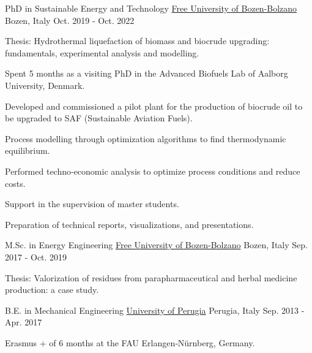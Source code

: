 
\begin{cventries}

\cventry
{PhD in Sustainable Energy and Technology}
{\href{https://unibz.it}{Free University of Bozen-Bolzano}}
{Bozen, Italy}
{Oct. 2019 - Oct. 2022}
{\begin{cvitems}
\item {Thesis: Hydrothermal liquefaction of biomass and biocrude upgrading: fundamentals, experimental analysis and modelling.}
\item {Spent 5 months as a visiting PhD in the Advanced Biofuels Lab of Aalborg University, Denmark.}
\item {Developed and commissioned a pilot plant for the production of biocrude oil to be upgraded to SAF (Sustainable Aviation Fuels).}
\item {Process modelling through optimization algorithms to find thermodynamic equilibrium.}
\item {Performed techno‑economic analysis to optimize process conditions and reduce costs.}
\item {Support in the supervision of master students.}
\item {Preparation of technical reports, visualizations, and presentations.}
\end{cvitems}}

\cventry
{M.Sc. in Energy Engineering}
{\href{https://unibz.it}{Free University of Bozen-Bolzano}}
{Bozen, Italy}
{Sep. 2017 - Oct. 2019}
{\begin{cvitems}
\item {Thesis: Valorization of residues from parapharmaceutical and herbal medicine production: a case study.}
\end{cvitems}}

\cventry
{B.E. in Mechanical Engineering}
{\href{https://unipg.it}{University of Perugia}}
{Perugia, Italy}
{Sep. 2013 - Apr. 2017}
{\begin{cvitems}
\item {Erasmus + of 6 months at the FAU Erlangen‑Nürnberg, Germany.}
\end{cvitems}}

\end{cventries}